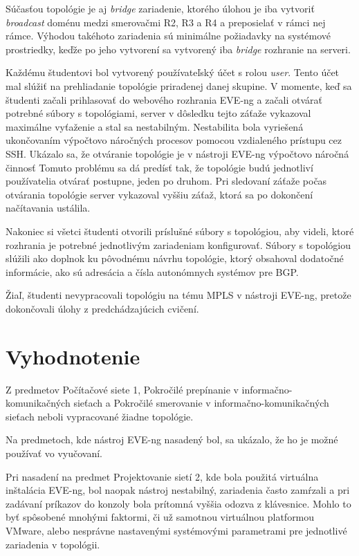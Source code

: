 Súčasťou topológie je aj \emph{bridge} zariadenie, ktorého úlohou je iba vytvoriť \emph{broadcast} doménu medzi smerovačmi R2, R3 a R4 a preposielať v rámci nej rámce. Výhodou takéhoto zariadenia sú minimálne požiadavky na systémové prostriedky, keďže po jeho vytvorení sa vytvorený iba \emph{bridge} rozhranie na serveri.

Každému študentovi bol vytvorený používateľský účet s rolou \emph{user}. Tento účet mal slúžiť na prehliadanie topológie priradenej danej skupine. V momente, keď sa študenti začali prihlasovať do webového rozhrania EVE-ng a začali otvárať potrebné súbory s topológiami, server v dôsledku tejto záťaže vykazoval maximálne vyťaženie a stal sa nestabilným. Nestabilita bola vyriešená ukončovaním výpočtovo náročných procesov pomocou vzdialeného prístupu cez SSH. Ukázalo sa, že otváranie topológie je v nástroji EVE-ng výpočtovo náročná činnosť Tomuto problému sa dá predísť tak, že topológie budú jednotliví používatelia otvárať postupne, jeden po druhom. Pri sledovaní záťaže počas otvárania topológie server vykazoval vyššiu záťaž, ktorá sa po dokončení načítavania ustálila.

Nakoniec si všetci študenti otvorili príslušné súbory s topológiou, aby videli, ktoré rozhrania je potrebné jednotlivým zariadeniam konfigurovať. Súbory s topológiou slúžili ako doplnok ku pôvodnému návrhu topológie, ktorý obsahoval dodatočné informácie, ako sú adresácia a čísla autonómnych systémov pre BGP.

Žiaľ, študenti nevypracovali topológiu na tému MPLS v nástroji EVE-ng, pretože dokončovali úlohy z predchádzajúcich cvičení.




\section{Vyhodnotenie}

Z predmetov Počítačové siete 1, Pokročilé prepínanie v informačno-komunikačných sieťach a Pokročilé smerovanie v informačno-komunikačných sieťach neboli vypracované žiadne topológie.

Na predmetoch, kde nástroj EVE-ng nasadený bol, sa ukázalo, že ho je možné používať vo vyučovaní.

Pri nasadení na predmet Projektovanie sietí 2, kde bola použitá virtuálna inštalácia EVE-ng, bol naopak nástroj nestabilný, zariadenia často zamŕzali a pri zadávaní príkazov do konzoly bola prítomná vyššia odozva z klávesnice. Mohlo to byť spôsobené mnohými faktormi, či už samotnou virtuálnou platformou VMware, alebo nesprávne nastavenými systémovými parametrami pre jednotlivé zariadenia v topológii.

